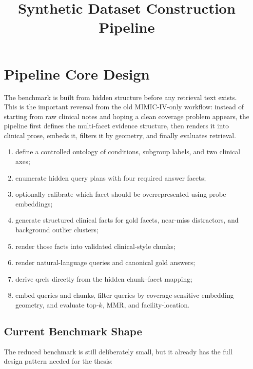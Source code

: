 \documentclass[11pt,a4paper]{article}
\title{\textbf{Synthetic Dataset Construction Pipeline}}
\date{}
\author{}
\begin{document}
\maketitle
\tableofcontents

\section{Pipeline Core Design}

The benchmark is built from hidden structure before any retrieval text exists. This is the important reversal from the old MIMIC-IV-only workflow: instead of starting from raw clinical notes and hoping a clean coverage problem appears, the pipeline first defines the multi-facet evidence structure, then renders it into clinical prose, embeds it, filters it by geometry, and finally evaluates retrieval.

\begin{enumerate}[noitemsep, topsep=0pt]
	\item define a controlled ontology of conditions, subgroup labels, and two clinical axes;
	\item enumerate hidden query plans with four required answer facets;
	\item optionally calibrate which facet should be overrepresented using probe embeddings;
	\item generate structured clinical facts for gold facets, near-miss distractors, and background outlier clusters;
	\item render those facts into validated clinical-style chunks;
	\item render natural-language queries and canonical gold answers;
	\item derive qrels directly from the hidden chunk--facet mapping;
	\item embed queries and chunks, filter queries by coverage-sensitive embedding geometry, and evaluate top-$k$, MMR, and facility-location.
\end{enumerate}

\subsection{Current Benchmark Shape}

The reduced benchmark is still deliberately small, but it already has the full design pattern needed for the thesis:
\end{document}
